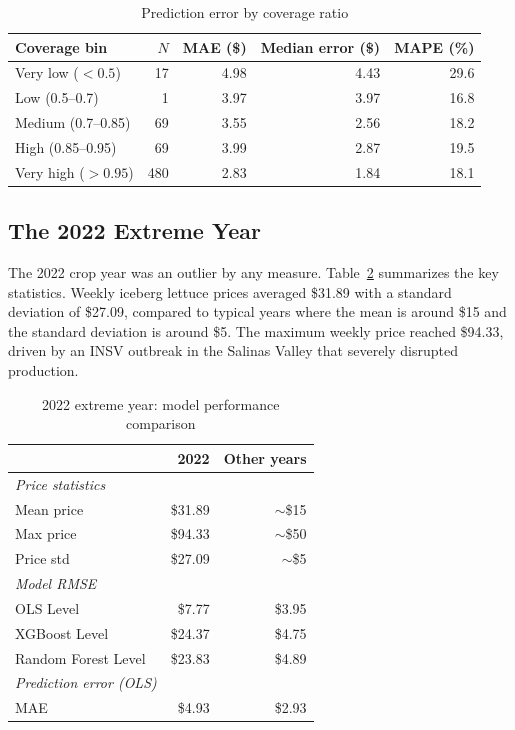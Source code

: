 \documentclass[12pt]{article}
\begin{document}
\begin{table}[!htbp]
\centering
\caption{Prediction error by coverage ratio}
\label{tab:coverage}
\begin{tabular}{lrrrr}
\toprule
Coverage bin & $N$ & MAE (\$) & Median error (\$) & MAPE (\%) \\
\midrule
Very low ($< 0.5$) & 17 & 4.98 & 4.43 & 29.6 \\
Low (0.5--0.7) & 1 & 3.97 & 3.97 & 16.8 \\
Medium (0.7--0.85) & 69 & 3.55 & 2.56 & 18.2 \\
High (0.85--0.95) & 69 & 3.99 & 2.87 & 19.5 \\
Very high ($> 0.95$) & 480 & 2.83 & 1.84 & 18.1 \\
\bottomrule
\end{tabular}
\end{table}

\subsection{The 2022 Extreme Year}
\label{subsec:extreme_2022}

The 2022 crop year was an outlier by any measure. Table~\ref{tab:extreme2022} summarizes the key statistics. Weekly iceberg lettuce prices averaged \$31.89 with a standard deviation of \$27.09, compared to typical years where the mean is around \$15 and the standard deviation is around \$5. The maximum weekly price reached \$94.33, driven by an INSV outbreak in the Salinas Valley that severely disrupted production.

\begin{table}[!htbp]
\centering
\caption{2022 extreme year: model performance comparison}
\label{tab:extreme2022}
\begin{tabular}{lrr}
\toprule
 & 2022 & Other years \\
\midrule
\textit{Price statistics} \\
\quad Mean price & \$31.89 & $\sim$\$15 \\
\quad Max price & \$94.33 & $\sim$\$50 \\
\quad Price std & \$27.09 & $\sim$\$5 \\
\addlinespace
\textit{Model RMSE} \\
\quad OLS Level & \$7.77 & \$3.95 \\
\quad XGBoost Level & \$24.37 & \$4.75 \\
\quad Random Forest Level & \$23.83 & \$4.89 \\
\addlinespace
\textit{Prediction error (OLS)} \\
\quad MAE & \$4.93 & \$2.93 \\
\bottomrule
\end{tabular}
\end{table}
\end{document}
